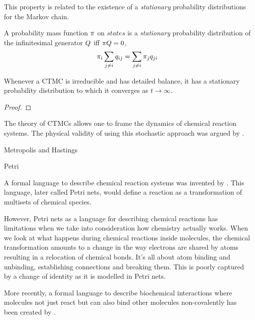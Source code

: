 This property is related to the existence of a
\emph{stationary} probability distributions for the Markov chain.

\begin{definition}
  A probability mass function $\pi$ on $states$ is
  a \emph{stationary} probability distribution of
  the infinitesimal generator $Q$ iff $\pi Q = 0$, \ie
  \[ \pi_i \sum_{j \neq i} q_{ij} = \sum_{j \neq i} \pi_j q_{ji} \]
\end{definition}

Whenever a CTMC is irreducible and has detailed balance,
it has a stationary probability distribution
to which it converges as $t \to \infty$.

\begin{lemma}
\end{lemma}
\begin{proof}
\end{proof}

The theory of CTMCs allows one to frame the dynamics of
chemical reaction systems.
The physical validity of using this stochastic approach
was argued by \citet{gillespie76}.

Metropolis and Hastings

Petri

A formal language to describe chemical reaction systems
was invented by \citet{petri}.
This language, later called Petri nets,
would define a reaction as a transformation of
multisets of chemical species.

However, Petri nets as a language for describing chemical reactions
has limitations when we take into consideration
how chemistry actually works.
When we look at what happens during chemical reactions
inside molecules, the chemical transformation amounts to
a change in the way electrons are shared by atoms
resulting in a relocation of chemical bonds.
It's all about atom binding and unbinding,
establishing connections and breaking them.
This is poorly captured by a change  of identity
as it is modelled in Petri nets.

More recently,
a formal language to describe biochemical interactions
where molecules not just react but can also bind other molecules
non-covalently has been created by \citet{danoslaneve2002a}.


















